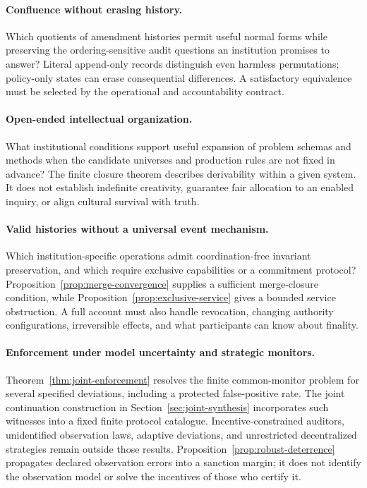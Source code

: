 \documentclass[11pt,letterpaper]{article}
\theoremstyle{plain}
\theoremstyle{definition}
\theoremstyle{remark}
\begin{document}
\paragraph{Confluence without erasing history.}
Which quotients of amendment histories permit useful normal forms while preserving the ordering-sensitive audit questions an institution promises to answer? Literal append-only records distinguish even harmless permutations; policy-only states can erase consequential differences. A satisfactory equivalence must be selected by the operational and accountability contract.

\paragraph{Open-ended intellectual organization.}
What institutional conditions support useful expansion of problem schemas and methods when the candidate universes and production rules are not fixed in advance? The finite closure theorem describes derivability within a given system. It does not establish indefinite creativity, guarantee fair allocation to an enabled inquiry, or align cultural survival with truth.

\paragraph{Valid histories without a universal event mechanism.}
Which institution-specific operations admit coordination-free invariant preservation, and which require exclusive capabilities or a commitment protocol? Proposition~\ref{prop:merge-convergence} supplies a sufficient merge-closure condition, while Proposition~\ref{prop:exclusive-service} gives a bounded service obstruction. A full account must also handle revocation, changing authority configurations, irreversible effects, and what participants can know about finality.

\paragraph{Enforcement under model uncertainty and strategic monitors.}
Theorem~\ref{thm:joint-enforcement} resolves the finite common-monitor problem for several specified deviations, including a protected false-positive rate. The joint continuation construction in Section~\ref{sec:joint-synthesis} incorporates such witnesses into a fixed finite protocol catalogue. Incentive-constrained auditors, unidentified observation laws, adaptive deviations, and unrestricted decentralized strategies remain outside those results. Proposition~\ref{prop:robust-deterrence} propagates declared observation errors into a sanction margin; it does not identify the observation model or solve the incentives of those who certify it.
\end{document}
